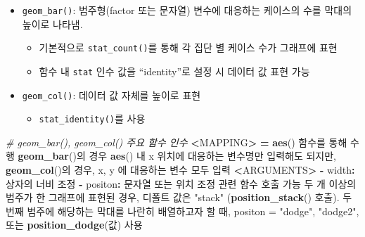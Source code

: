 \documentclass[
  11pt,
]{krantz}
\newenvironment{Shaded}{\begin{snugshade}}{\end{snugshade}}
\newcommand{\CommentTok}[1]{\textcolor[rgb]{0.37,0.37,0.37}{\textit{#1}}}
\newcommand{\ErrorTok}[1]{\textcolor[rgb]{0.14,0.14,0.14}{\textbf{#1}}}
\newcommand{\KeywordTok}[1]{\textcolor[rgb]{0.27,0.27,0.27}{\textbf{#1}}}
\newcommand{\NormalTok}[1]{#1}
\newcommand{\OperatorTok}[1]{\textcolor[rgb]{0.43,0.43,0.43}{\textbf{#1}}}
\newcommand{\StringTok}[1]{\textcolor[rgb]{0.5,0.5,0.5}{#1}}
\providecommand{\tightlist}{%
  \setlength{\itemsep}{0pt}\setlength{\parskip}{0pt}}
\begin{document}
\begin{itemize}
\tightlist
\item
  \texttt{geom\_bar()}: 범주형(factor 또는 문자열) 변수에 대응하는 케이스의 수를 막대의 높이로 나타냄.

  \begin{itemize}
  \tightlist
  \item
    기본적으로 \texttt{stat\_count()}를 통해 각 집단 별 케이스 수가 그래프에 표현
  \item
    함수 내 \texttt{stat} 인수 값을 ``identity''로 설정 시 데이터 값 표현 가능
  \end{itemize}
\item
  \texttt{geom\_col()}: 데이터 값 자체를 높이로 표현

  \begin{itemize}
  \tightlist
  \item
    \texttt{stat\_identity()}를 사용
  \end{itemize}
\end{itemize}

\footnotesize

\begin{Shaded}
\begin{Highlighting}[]
\CommentTok{# geom_bar(), geom_col() 주요 함수 인수}
\OperatorTok{<}\NormalTok{MAPPING}\OperatorTok{>}\StringTok{ }\ErrorTok{=}\StringTok{ }\KeywordTok{aes}\NormalTok{() 함수를 통해 수행}
            \KeywordTok{geom_bar}\NormalTok{()의 경우 }\KeywordTok{aes}\NormalTok{() 내 x 위치에 대응하는}
\NormalTok{            변수명만 입력해도 되지만, }\KeywordTok{geom_col}\NormalTok{()의 경우, }
\NormalTok{            x, y 에 대응하는 변수 모두 입력}
\OperatorTok{<}\NormalTok{ARGUMENTS}\OperatorTok{>}
\StringTok{  }\OperatorTok{-}\StringTok{ }\NormalTok{width}\OperatorTok{:}\StringTok{ }\NormalTok{상자의 너비 조정}
  \OperatorTok{-}\StringTok{ }\NormalTok{positon}\OperatorTok{:}\StringTok{ }\NormalTok{문자열 또는 위치 조정 관련 함수 호출 가능}
\NormalTok{    두 개 이상의 범주가 한 그래프에 표현된 경우, }
\NormalTok{    디폴트 값은 }\StringTok{"stack"}\NormalTok{ (}\KeywordTok{position_stack}\NormalTok{() 호출). }
\NormalTok{    두 번째 범주에 해당하는 막대를 나란히 배열하고자 할 때, }
\NormalTok{    positon =}\StringTok{ "dodge"}\NormalTok{, }\StringTok{"dodge2"}\NormalTok{, 또는 }\KeywordTok{position_dodge}\NormalTok{(값) 사용}
\end{Highlighting}
\end{Shaded}

\normalsize
\end{document}
